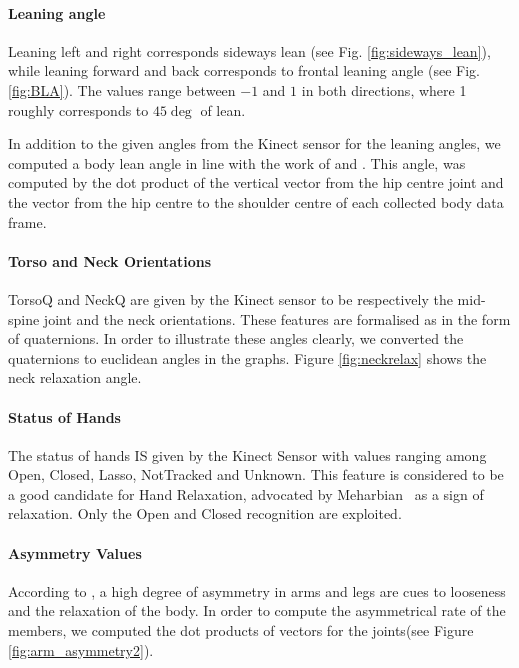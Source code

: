 \paragraph{Leaning angle}
Leaning left and right corresponds sideways lean (see Fig. \ref{fig:sideways_lean}), while leaning forward and back corresponds to frontal leaning angle (see Fig. \ref{fig:BLA}).
The values range between $-1$ and $1$ in both directions, where 1 roughly corresponds to $45\deg$ of lean.

In addition to the given angles from the Kinect sensor for the leaning angles, we computed a body lean angle in line with the work of \cite{Castellano2009} and \cite{Schegloff}. This angle, was computed by the dot product of the vertical vector from the hip centre joint and the vector from the hip centre to the shoulder centre of each collected body data frame.

\paragraph{Torso and Neck Orientations}
TorsoQ and NeckQ are given by the Kinect sensor to be respectively the mid-spine joint and the neck orientations.
These features are formalised as in the form of quaternions.
In order to illustrate  these angles clearly, we converted the quaternions to euclidean angles in the graphs.
Figure \ref{fig:neckrelax} shows the neck relaxation angle.


\paragraph{Status of Hands}
The status of hands IS given by the Kinect Sensor with values ranging among Open, Closed, Lasso, NotTracked and Unknown.
This feature is considered to be a good candidate for Hand Relaxation, advocated by Meharbian~\cite{Mehrabian1968} as a sign of relaxation.
Only the Open and Closed recognition are exploited.

\paragraph{Asymmetry Values}
According to \cite{Mehrabian}, a high degree of asymmetry in arms and legs are cues to looseness and the relaxation of the body.
In order to compute the asymmetrical rate of the members, we computed the dot products of vectors for the joints(see Figure \ref{fig:arm_asymmetry2}).

